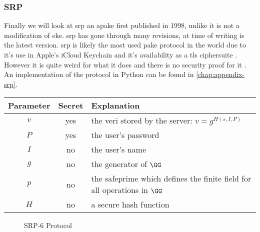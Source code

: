 \clearpage

\subsubsection{SRP}
Finally we will look at \gls{srp} an \gls{apake} first published in 1998, unlike  it is not a modification of \gls{eke}.
\gls{srp} has gone through many revisions, at time of writing  is the latest version.
\gls{srp} is likely the most used \gls{pake} protocol in the world due to it's use in Apple's iCloud Keychain \cite{apple-keychain-srp} and it's availability as a \gls{tls} ciphersuite \cite{tls-srp}.
However it is quite weird for what it does and there is no security proof for it \cite{srp-blog}. An implementation of the protocol in Python can be found in \cref{chap:appendix-srp}.

\begin{center}
  \begin{tabularx}{\linewidth}{ ccX }
    \toprule
    Parameter & Secret & Explanation \\
    \midrule
    $v$ & yes & the \gls{veri}\label{text:srp-verifier-generation} stored by the server: $v=g^{H(s,I,P)}$ \\
    $P$ & yes & the user's password \\
    $I$ & no & the user's name \\
    $g$ & no & the generator of $\GG$ \\
    $p$ & no & the \gls{safeprime} which defines the finite field for all operations in $\GG$ \\
    $H$ & no & a secure hash function \\
    \bottomrule
  \end{tabularx}
\end{center}

\begin{figure}[H]

  \caption{SRP-6 Protocol}
  \label{fig:srp}
\end{figure}

